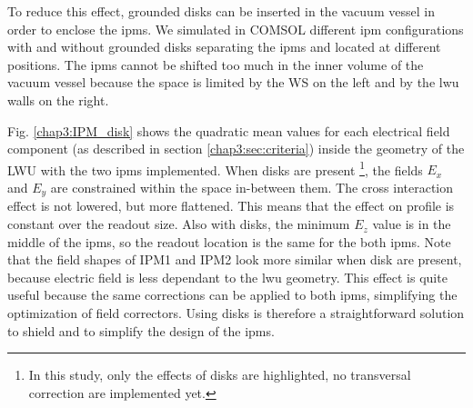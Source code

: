 \begin{refsection}
  To reduce this effect, grounded disks can be inserted in the vacuum vessel in order to enclose the \acrshort{ipm}s.
  We simulated in COMSOL different \acrshort{ipm} configurations with and without grounded disks separating the \acrshort{ipm}s and located at different positions. The \acrshort{ipm}s cannot be shifted too much in the inner volume of the vacuum vessel because the space is limited by the WS on the left and by the \acrshort{lwu} walls on the right.

  
  Fig. \ref{chap3:IPM_disk} shows the quadratic mean values for each electrical field component (as described in section \ref{chap3:sec:criteria}) inside the geometry of the LWU with the two \acrshort{ipm}s implemented. When disks are present \footnote{In this study, only the effects of disks are highlighted, no transversal correction are implemented yet.}, the fields $E_{x}$ and $E_{y}$ are constrained within the space in-between them. The cross interaction effect is not lowered, but more flattened. This means that the effect on profile is constant over the readout size.
  Also with disks, the minimum $E_{z}$ value is in the middle of the \acrshort{ipm}s, so the readout location is the same for the both \acrshort{ipm}s.
  Note that the field shapes of IPM1 and IPM2 look more similar when disk are present, because electric field is less dependant to the \acrshort{lwu} geometry. This effect is quite useful because the same corrections can be applied to both \acrshort{ipm}s, simplifying the optimization of field correctors. Using disks is therefore a straightforward solution to shield and to simplify the design of the \acrshort{ipm}s.





\end{refsection}
